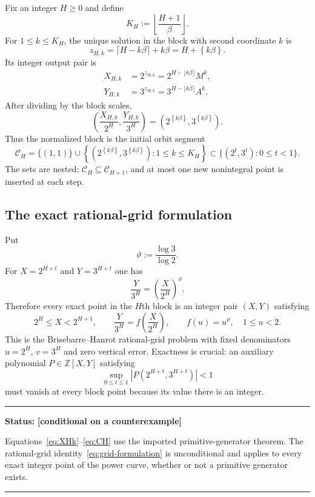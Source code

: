 \documentclass[11pt,oneside]{article}
\theoremstyle{definition}
\theoremstyle{remark}
\newcommand{\Z}{\mathbb Z}
\newcommand{\cC}{\mathcal C}
\newcommand{\fract}[1]{\left\{#1\right\}}
\newcommand{\thetaAE}{\vartheta}
\newcommand{\statusconditional}{\textcolor{conditionalblue}{\textbf{[conditional on a counterexample]}}}
\newenvironment{statusbox}[1]
{\begin{center}\begin{minipage}{0.94\textwidth}\raggedright\hrule\vspace{0.45em}\textbf{Status:} #1\par\vspace{0.35em}}
{\vspace{0.35em}\hrule\end{minipage}\end{center}}
\begin{document}
Fix an integer $H\ge0$ and define
\[
 K_H:=\left\lfloor\frac{H+1}{\beta}\right\rfloor.
\]
For $1\le k\le K_H$, the unique solution in the block with second coordinate $k$ is
\[
 z_{H,k}=\lceil H-k\beta\rceil+k\beta=H+\fract{k\beta}.
\]
Its integer output pair is
\begin{align}
 X_{H,k}&=2^{z_{H,k}}=2^{H-\lfloor k\beta\rfloor}M^k,\label{eq:XHk}\\
 Y_{H,k}&=3^{z_{H,k}}=3^{H-\lfloor k\beta\rfloor}A^k.\label{eq:YHk}
\end{align}
After dividing by the block scales,
\begin{equation}
 \left(\frac{X_{H,k}}{2^H},\frac{Y_{H,k}}{3^H}\right)
 =\left(2^{\fract{k\beta}},3^{\fract{k\beta}}\right).
 \label{eq:normalized-orbit}
\end{equation}
Thus the normalized block is the initial orbit segment
\begin{equation}
 \cC_H=\{(1,1)\}\cup
 \left\{\left(2^{\fract{k\beta}},3^{\fract{k\beta}}\right):1\le k\le K_H\right\}
 \subset\{(2^t,3^t):0\le t<1\}.
 \label{eq:CH}
\end{equation}
The sets are nested: $\cC_H\subseteq\cC_{H+1}$, and at most one new nonintegral point is
inserted at each step.

\subsection{The exact rational-grid formulation}

Put
\[
 \thetaAE:=\frac{\log3}{\log2}.
\]
For $X=2^{H+t}$ and $Y=3^{H+t}$ one has
\[
 \frac{Y}{3^H}=\left(\frac{X}{2^H}\right)^{\thetaAE}.
\]
Therefore every exact point in the $H$th block is an integer pair $(X,Y)$ satisfying
\begin{equation}
 2^H\le X<2^{H+1},\qquad
 \frac{Y}{3^H}=f\!\left(\frac{X}{2^H}\right),
 \qquad f(u)=u^{\thetaAE},\quad 1\le u<2.
 \label{eq:grid-formulation}
\end{equation}
This is the Brisebarre--Hanrot rational-grid problem with fixed denominators
$u=2^H$, $v=3^H$ and zero vertical error.  Exactness is crucial: an auxiliary polynomial
$P\in\Z[X,Y]$ satisfying
\[
 \sup_{0\le t\le1}|P(2^{H+t},3^{H+t})|<1
\]
must vanish at every block point because its value there is an integer.

\begin{statusbox}{\statusconditional}
Equations~\eqref{eq:XHk}--\eqref{eq:CH} use the imported primitive-generator theorem.  The
rational-grid identity~\eqref{eq:grid-formulation} is unconditional and applies to every exact
integer point of the power curve, whether or not a primitive generator exists.
\end{statusbox}
\end{document}
